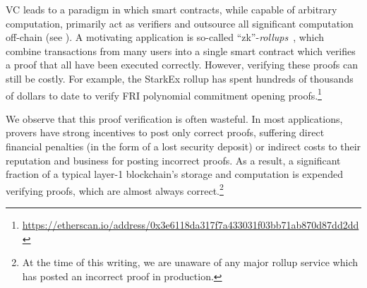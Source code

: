 VC leads to a paradigm in which smart contracts, while capable of arbitrary computation, primarily act as verifiers and outsource all significant computation off-chain (see ). A motivating application is so-called ``zk''-\emph{rollups}\footnotemark~\cite{starknet,zksync,aztec,dydx,scroll}, which combine transactions from many users into a single smart contract which verifies a proof that all have been executed correctly.
However, verifying these proofs can still be costly. For example, the StarkEx rollup 
has spent hundreds of thousands of dollars to date to verify FRI polynomial commitment opening proofs.\footnote{\url{https://etherscan.io/address/0x3e6118da317f7a433031f03bb71ab870d87dd2dd}}

We observe that this proof verification is often wasteful. In most applications, provers have strong incentives to post only correct proofs, suffering direct financial penalties (in the form of a lost security deposit) or indirect costs to their reputation and business for posting incorrect proofs. As a result, a significant fraction of a typical layer-1 blockchain's storage and computation is expended verifying proofs, which are almost always correct.\footnote{At the time of this writing, we are unaware of any major rollup service which has posted an incorrect proof in production.}

